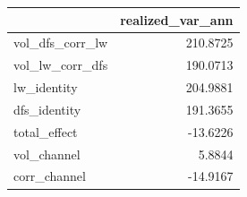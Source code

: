 \begin{tabular}{lr}
\toprule
 & realized_var_ann \\
\midrule
vol_dfs_corr_lw & 210.8725 \\
vol_lw_corr_dfs & 190.0713 \\
lw_identity & 204.9881 \\
dfs_identity & 191.3655 \\
total_effect & -13.6226 \\
vol_channel & 5.8844 \\
corr_channel & -14.9167 \\
\bottomrule
\end{tabular}
